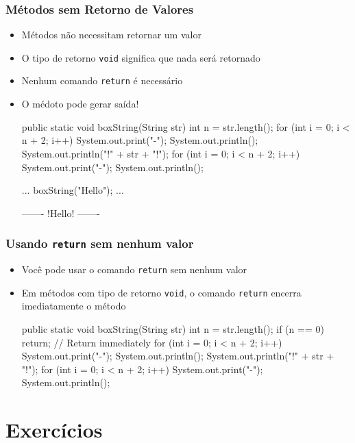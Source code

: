 \documentclass[xcolor={dvipsnames,table},aspectratio=169]{beamer}
\begin{document}
\begin{frame}[fragile]\frametitle{Métodos sem Retorno de Valores}
\begin{itemize}
	\item Métodos não necessitam retornar um valor
	\item O tipo de retorno \texttt{void} significa que nada será retornado
	\item Nenhum comando \texttt{return} é necessário
	\item O médoto pode gerar saída!
{\tiny
\begin{javacode}
public static void boxString(String str) {
  int n = str.length();
  for (int i = 0; i < n + 2; i++)  { System.out.print("-"); }
  System.out.println();
  System.out.println("!" + str + "!");
  for (int i = 0; i < n + 2; i++)  { System.out.print("-"); }
  System.out.println();
}
\end{javacode}
\begin{javacode}
...
boxString("Hello");
...
\end{javacode}
\begin{javacode}
-------
!Hello!
-------
\end{javacode}
}
\end{itemize}
\end{frame}

\begin{frame}[fragile]\frametitle{Usando \texttt{return} sem nenhum valor}
\begin{itemize}
	\item Você pode usar o comando \texttt{return} sem nenhum valor
	\item Em métodos com tipo de retorno \texttt{void}, o comando \texttt{return} encerra imediatamente o método
{\scriptsize
\begin{javacode}
public static void boxString(String str) {
  int n = str.length();
  if (n == 0) {
    return; // Return immediately
  }
  for (int i = 0; i < n + 2; i++) { System.out.print("-"); }
  System.out.println();
  System.out.println("!" + str + "!");
  for (int i = 0; i < n + 2; i++) { System.out.print("-"); }
  System.out.println();
}
\end{javacode}
}
\end{itemize}
\end{frame}

\section{Exercícios}
\end{document}
